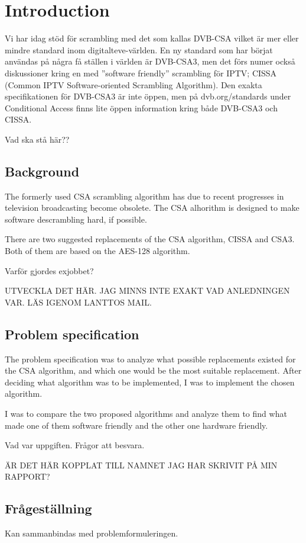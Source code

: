 \chapter{Introduction}
Vi har idag stöd för scrambling med det som kallas DVB-CSA vilket är 
mer eller mindre standard inom digitalteve-världen. En ny standard som 
har börjat användas på några få ställen i världen är DVB-CSA3, men det 
förs numer också diskussioner kring en med ”software friendly” 
scrambling för IPTV; CISSA (Common IPTV Software-oriented Scrambling 
Algorithm). Den exakta specifikationen för DVB-CSA3 är inte öppen, men 
på dvb.org/standards under Conditional Access finns lite öppen 
information kring både DVB-CSA3 och CISSA.

Vad ska stå här??

\section{Background}
The formerly used CSA scrambling algorithm has due to recent 
progresses in television broadcasting become obsolete. The CSA 
alhorithm is designed to make software descrambling hard, if possible.

There are two suggested replacements of the CSA algorithm, CISSA and 
CSA3. Both of them are based on the AES-128 algorithm. 


Varför gjordes exjobbet?

UTVECKLA DET HÄR. JAG MINNS INTE EXAKT VAD ANLEDNINGEN VAR. 
LÄS IGENOM LANTTOS MAIL.

\section{Problem specification}
The problem specification was to analyze what possible replacements 
existed for the CSA algorithm, and which one would be the most suitable 
replacement. 
After deciding what algorithm was to be implemented, I was to implement 
the chosen algorithm.

I was to compare the two proposed algorithms and analyze them to find 
what made one of them software friendly and the other one hardware 
friendly.


Vad var uppgiften. Frågor att besvara.

ÄR DET HÄR KOPPLAT TILL NAMNET JAG HAR SKRIVIT PÅ MIN RAPPORT?

\section{Frågeställning}
Kan sammanbindas med problemformuleringen.

